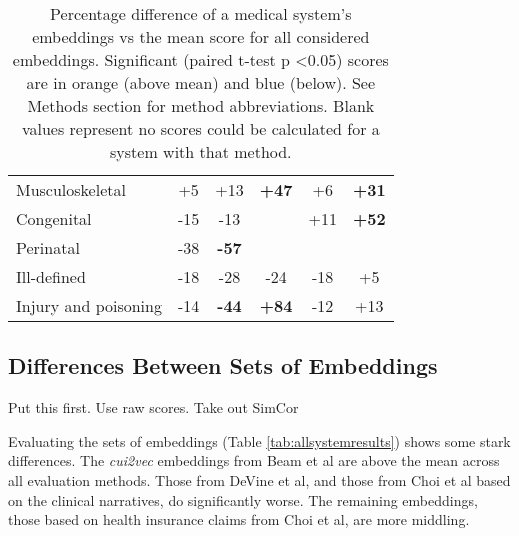 \documentclass[11pt,a4paper]{article}
\def\blu#1{{\textbf{\color{blu}#1}}}
\def\red#1{{\color{red}#1}}
\def\ora#1{{\textbf{\color{ora}#1}}}
\begin{document}
\begin{table*}[h]
\begin{center}
\begin{tabular}{l|c|c|c|c|c}
		Musculoskeletal        & +5                         & +13                          & \ora{+47}  & +6                        & \ora{+31} \\
		Congenital           & -15                         & -13                        &                               & +11                        & \ora{+52} \\
		Perinatal            & -38                        & \blu{-57} &                               &                              &                              \\
		Ill-defined          & -18                        & -28                        & -24                        & -18                       & +5                        \\
		Injury and poisoning & -14                        & \blu{-44} & \ora{+84}  & -12                       & +13                       
	\end{tabular}
	\caption{Percentage difference of a medical system's embeddings vs the mean score for all considered embeddings. Significant (paired t-test p \textless 0.05) scores are in orange (above mean) and blue (below). See Methods section for method abbreviations. Blank values represent no scores could be calculated for a system with that method.}
\end{center}
\end{table*}

\subsection{Differences Between Sets of Embeddings}
\red{Put this first. Use raw scores. Take out SimCor}

 Evaluating the sets of embeddings (Table \ref{tab:allsystemresults}) shows some stark differences. The \emph{cui2vec} embeddings from Beam et al are above the mean across all evaluation methods. Those from DeVine et al, and those from Choi et al based on the clinical narratives, do significantly worse. The remaining embeddings, those based on health insurance claims from Choi et al, are more middling. 
\end{document}
